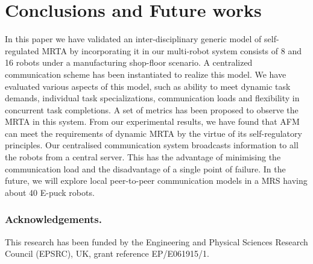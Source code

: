 \documentclass[smallcondensed]{svjour3}
\begin{document}
\section{Conclusions and Future works}
\label{sec:conc}
In this paper we have validated an inter-disciplinary generic model of self-regulated MRTA by incorporating it in our multi-robot system consists of 8 and 16 robots under a manufacturing shop-floor scenario. A centralized communication scheme has been instantiated to realize this model. We have evaluated various aspects of this model, such as ability to meet dynamic task demands, individual task specializations, communication loads and flexibility in concurrent task completions. A set of metrics has been proposed to observe the MRTA in this system. From our experimental results, we have found that AFM can meet the requirements of dynamic MRTA by the virtue of its self-regulatory principles. Our centralised communication system broadcasts information to all the robots from a central server. This has the advantage of minimising the communication load and the disadvantage of a single point of failure. In the future, we will explore local peer-to-peer communication models in a MRS having about 40 E-puck robots.
\subsubsection*{Acknowledgements. } 
This research has been funded by the Engineering and Physical Sciences Research Council (EPSRC), UK, grant reference EP/E061915/1.
 
%      
%
\end{document}
